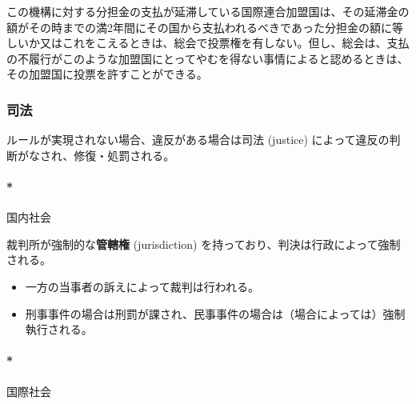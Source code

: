 \documentclass[
  xelatex,
  ja=standard]{bxjsarticle}
\let\oldparagraph\paragraph
\renewcommand{\paragraph}[1]{\oldparagraph{#1}\mbox{}}
\providecommand{\tightlist}{%
  \setlength{\itemsep}{0pt}\setlength{\parskip}{0pt}}\usepackage{longtable,booktabs,array}
\begin{document}
\begin{tcolorbox}[enhanced jigsaw, leftrule=.75mm, bottomrule=.15mm, left=2mm, toprule=.15mm, breakable, colbacktitle=quarto-callout-note-color!10!white, opacitybacktitle=0.6, bottomtitle=1mm, toptitle=1mm, colback=white, titlerule=0mm, arc=.35mm, title=\textcolor{quarto-callout-note-color}{\faInfo}\hspace{0.5em}{\href{https://www.unic.or.jp/info/un/charter/text_japanese/}{国連憲章}　第19条}, opacityback=0, colframe=quarto-callout-note-color-frame, coltitle=black, rightrule=.15mm]

この機構に対する分担金の支払が延滞している国際連合加盟国は、その延滞金の額がその時までの満2年間にその国から支払われるべきであった分担金の額に等しいか又はこれをこえるときは、総会で投票権を有しない。但し、総会は、支払の不履行がこのような加盟国にとってやむを得ない事情によると認めるときは、その加盟国に投票を許すことができる。

\end{tcolorbox}

\hypertarget{ux53f8ux6cd5}{%
\subsubsection{司法}\label{ux53f8ux6cd5}}

ルールが実現されない場合、違反がある場合は司法 (justice)
によって違反の判断がなされ、修復・処罰される。

\hypertarget{ux56fdux5185ux793eux4f1a-2}{%
\paragraph*{国内社会}\label{ux56fdux5185ux793eux4f1a-2}}

裁判所が強制的な\textbf{管轄権} (jurisdiction)
を持っており、判決は行政によって強制される。

\begin{itemize}
\tightlist
\item
  一方の当事者の訴えによって裁判は行われる。
\item
  刑事事件の場合は刑罰が課され、民事事件の場合は（場合によっては）強制執行される。
\end{itemize}

\hypertarget{ux56fdux969bux793eux4f1a-2}{%
\paragraph*{国際社会}\label{ux56fdux969bux793eux4f1a-2}}
\end{document}
